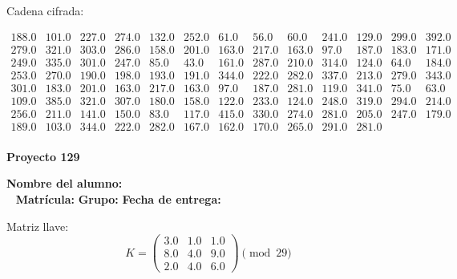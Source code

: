 \documentclass[12pt]{article}
\begin{document}
Cadena cifrada:
\begin{center}
$\begin{array}{lllllllllllll}
188.0 & 101.0 & 227.0 & 274.0 & 132.0 & 252.0 & 61.0 & 56.0 & 60.0 & 241.0 & 129.0 & 299.0 & 392.0\\
279.0 & 321.0 & 303.0 & 286.0 & 158.0 & 201.0 & 163.0 & 217.0 & 163.0 & 97.0 & 187.0 & 183.0 & 171.0\\
249.0 & 335.0 & 301.0 & 247.0 & 85.0 & 43.0 & 161.0 & 287.0 & 210.0 & 314.0 & 124.0 & 64.0 & 184.0\\
253.0 & 270.0 & 190.0 & 198.0 & 193.0 & 191.0 & 344.0 & 222.0 & 282.0 & 337.0 & 213.0 & 279.0 & 343.0\\
301.0 & 183.0 & 201.0 & 163.0 & 217.0 & 163.0 & 97.0 & 187.0 & 281.0 & 119.0 & 341.0 & 75.0 & 63.0\\
109.0 & 385.0 & 321.0 & 307.0 & 180.0 & 158.0 & 122.0 & 233.0 & 124.0 & 248.0 & 319.0 & 294.0 & 214.0\\
256.0 & 211.0 & 141.0 & 150.0 & 83.0 & 117.0 & 415.0 & 330.0 & 274.0 & 281.0 & 205.0 & 247.0 & 179.0\\
189.0 & 103.0 & 344.0 & 222.0 & 282.0 & 167.0 & 162.0 & 170.0 & 265.0 & 291.0 & 281.0\\
\end{array}$
\end{center}

\newpage


\textbf{Proyecto 129}

\textbf{Nombre del alumno:} \underline{\hspace{13cm}}\\\
\vspace{1cm}
\textbf{Matrícula:} \underline{\hspace{4cm}} \hspace{1cm}
\textbf{Grupo:} \underline{\hspace{2cm}}
\textbf{Fecha de entrega:} \underline{\hspace{2cm}}

\medskip

Matriz llave:
\[
K = \begin{pmatrix}
3.0 & 1.0 & 1.0\\
8.0 & 4.0 & 9.0\\
2.0 & 4.0 & 6.0
\end{pmatrix} \pmod{29}
\]
\end{document}
